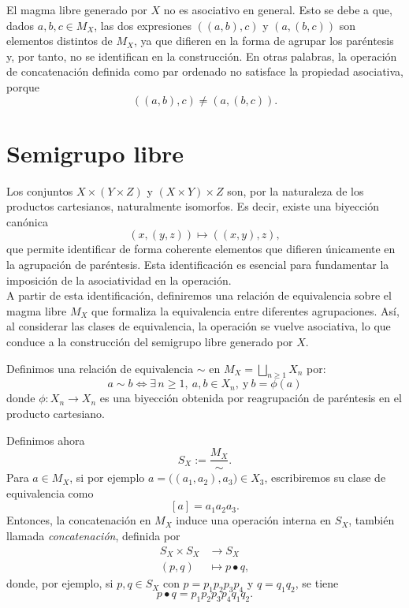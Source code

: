 \begin{observacion}
	\upshape
	El magma libre generado por \(X\) no es asociativo en general. Esto se debe a que, dados \(a,b,c \in M_X\), las dos expresiones \(((a,b),c)\) y \((a,(b,c))\) son elementos distintos de \(M_X\), ya que difieren en la forma de agrupar los paréntesis y, por tanto, no se identifican en la construcción. En otras palabras, la operación de concatenación definida como par ordenado no satisface la propiedad asociativa, porque
	\[
	((a,b),c) \neq (a,(b,c)).
	\]
\end{observacion}



\section{Semigrupo libre}


\noindent Los conjuntos \(X \times (Y \times Z)\) y \((X \times Y) \times Z\) son, por la naturaleza de los productos cartesianos, naturalmente isomorfos. Es decir, existe una biyección canónica
	\[
	(x, (y, z)) \mapsto ((x, y), z),
	\]
	que permite identificar de forma coherente elementos que difieren únicamente en la agrupación de paréntesis. Esta identificación es esencial para fundamentar la imposición de la asociatividad en la operación.\\
	
	\noindent A partir de esta identificación, definiremos una relación de equivalencia sobre el magma libre \(M_X\) que formaliza la equivalencia entre diferentes agrupaciones. Así, al considerar las clases de equivalencia, la operación se vuelve asociativa, lo que conduce a la construcción del semigrupo libre generado por \(X\).


\begin{definicion}
	\upshape
	Definimos una relación de equivalencia \(\sim\) en \(M_X = \bigsqcup_{n \geq 1} X_n\) por:
	\[
	a \sim b \iff \exists\, n \geq 1,\ a, b \in X_n,\ \text{y}\ b = \phi(a)
	\]
	donde \(\phi : X_n \to X_n\) es una biyección obtenida por reagrupación de paréntesis en el producto cartesiano.
\end{definicion}





Definimos ahora
$$
S_X := \frac{M_X}{\sim}.
$$
Para \(a \in M_X\), si por ejemplo \(a = \bigl((a_1, a_2), a_3\bigr) \in X_3\), escribiremos su clase de equivalencia como
$$
[a] = a_1 a_2 a_3.
$$
Entonces, la concatenación en \(M_X\) induce una operación interna en \(S_X\), también llamada \emph{concatenación}, definida por
$$
\begin{aligned}
	S_X \times S_X &\longrightarrow S_X \\
	(p, q) &\longmapsto p \bullet q,
\end{aligned}
$$
donde, por ejemplo, si \(p, q \in S_X\) con \(p = p_1 p_2 p_3 p_4\) y \(q = q_1 q_2\), se tiene
$$
p \bullet q = p_1 p_2 p_3 p_4 q_1 q_2.
$$

